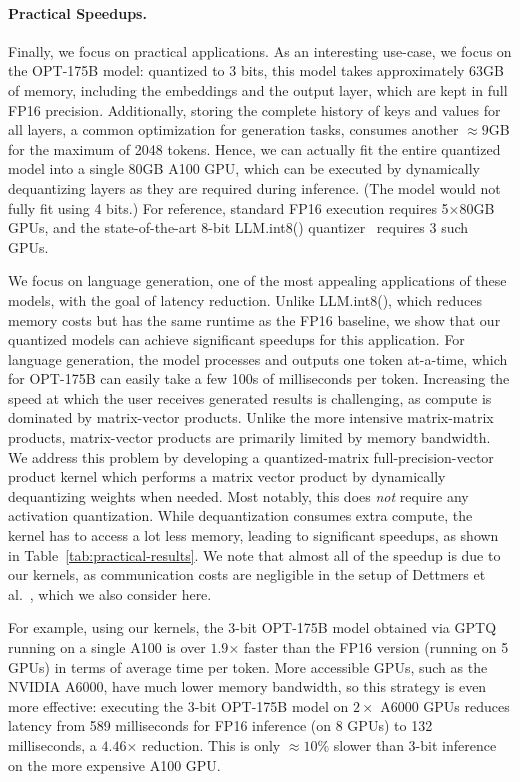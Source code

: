 \paragraph{Practical Speedups.} Finally, we focus on practical applications. As an interesting use-case, we focus on the OPT-175B model: quantized to 3 bits, this model takes approximately 63GB of memory, including the embeddings and the output layer, which are kept in full FP16 precision. Additionally, storing the complete history of keys and values for all layers, a common optimization for generation tasks, consumes another $\approx 9$GB for the maximum of 2048 tokens. Hence, we can actually fit the entire quantized model into a single 80GB A100 GPU, which can be executed by dynamically dequantizing layers as they are required during inference. (The model would not fully fit using 4 bits.) For reference, standard FP16 execution requires 5$\times$80GB GPUs, and the state-of-the-art 8-bit LLM.int8() quantizer~\cite{dettmers2022llm} requires 3 such GPUs. 

We focus on language generation, one of the most appealing applications of these models, with the goal of latency reduction. Unlike LLM.int8(), which reduces memory costs but has the same runtime as the FP16 baseline, we show that our quantized models can achieve significant speedups for this application. For language generation, the model processes and outputs one token at-a-time, which for OPT-175B can easily take a few 100s of milliseconds per token. Increasing the speed at which the user receives generated results is challenging, as compute is dominated by matrix-vector products. Unlike the more intensive matrix-matrix products, matrix-vector products are primarily limited by memory bandwidth. We address this problem by developing a quantized-matrix full-precision-vector product kernel which performs a matrix vector product by dynamically dequantizing weights when needed. Most notably, this does \emph{not} require any activation quantization. While dequantization consumes extra compute, the kernel has to access a lot less memory, leading to significant speedups, as shown in Table~\ref{tab:practical-results}. We note that almost all of the speedup is due to our kernels, as communication costs are negligible in the setup of Dettmers et al.~\cite{dettmers2022llm}, which we also consider here.

For example, using our kernels, the 3-bit OPT-175B model obtained via GPTQ running on a single A100 is over $\mathbf{1.9\boldsymbol{\times}}$ faster than the FP16 version (running on 5 GPUs) in terms of average time per token. More accessible GPUs, such as the NVIDIA A6000, have much lower memory bandwidth, so this strategy is even more effective: executing the 3-bit OPT-175B model on $2\times$ A6000 GPUs reduces latency from 589 milliseconds for FP16 inference (on 8 GPUs) to 132 milliseconds, a $\mathbf{4.46\boldsymbol{\times}}$ reduction. This is only $\approx10\%$ slower than 3-bit inference on the more expensive A100 GPU.

